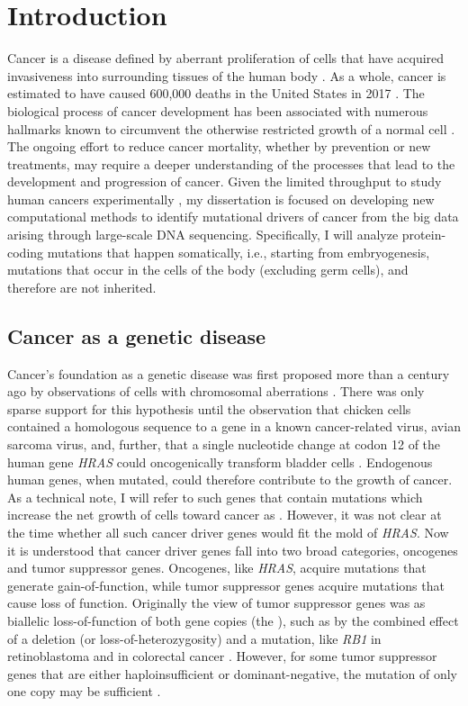 
\chapter{Introduction}
\label{chap:intro}

Cancer is a disease defined by aberrant proliferation of cells that have acquired invasiveness into surrounding tissues of the human body \cite{RN21}. As a whole, cancer is estimated to have caused 600,000 deaths in the United States in 2017 \cite{RN165}. The biological process of cancer development has been associated with numerous hallmarks known to circumvent the otherwise restricted growth of a normal cell \cite{RN24}. The ongoing effort to reduce cancer mortality, whether by prevention or new treatments, may require a deeper understanding of the processes that lead to the development and progression of cancer. Given the limited throughput to study human cancers experimentally \cite{RN61}, my dissertation is focused on developing new computational methods to identify mutational drivers of cancer from the big data arising through large-scale DNA sequencing. Specifically, I will analyze protein-coding mutations that happen somatically, i.e., starting from embryogenesis, mutations that occur in the cells of the body (excluding germ cells), and therefore are not inherited.

\section{Cancer as a genetic disease}
\label{sec:section}

Cancer's foundation as a genetic disease was first proposed more than a century ago by observations of cells with chromosomal aberrations \cite{RN18}. There was only sparse support for this hypothesis until the observation that chicken cells contained a homologous sequence to a gene in a known cancer-related virus, avian sarcoma virus, \cite{RN20} and, further, that a single nucleotide change at codon 12 of the human gene \textit{HRAS} could oncogenically transform bladder cells \cite{RN21, RN19}. Endogenous human genes, when mutated, could therefore contribute to the growth of cancer. As a technical note, I will refer to such genes that contain mutations which increase the net growth of cells toward cancer as . However, it was not clear at the time whether all such cancer driver genes would fit the mold of \textit{HRAS}.  Now it is understood that cancer driver genes fall into two broad categories, oncogenes and tumor suppressor genes. Oncogenes, like \textit{HRAS}, acquire mutations that generate gain-of-function, while tumor suppressor genes acquire mutations that cause loss of function. Originally the view of tumor suppressor genes was as biallelic loss-of-function of both gene copies (the \cite{RN22}), such as by the combined effect of a deletion (or loss-of-heterozygosity) and a mutation, like \textit{RB1} in retinoblastoma \cite{RN23} and  in colorectal cancer \cite{RN1}. However, for some tumor suppressor genes that are either haploinsufficient or dominant-negative, the mutation of only one copy may be sufficient \cite{RN163, RN161, RN162}.

